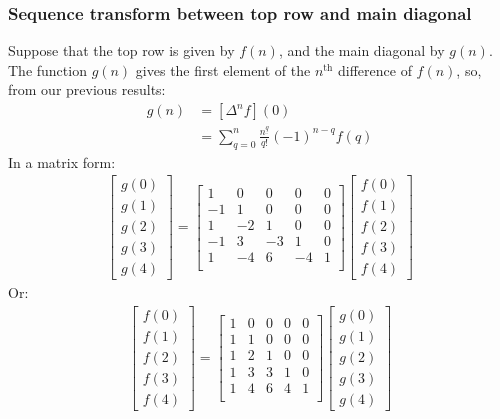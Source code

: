 \documentclass{article}
\renewcommand\({\left(}
\renewcommand\){\right)}
\begin{document}
\subsubsection{Sequence transform between top row and main diagonal}
Suppose that the top row is given by $f(n)$, and the main diagonal by $g(n)$. The function $g(n)$ gives the first element of the $n^\text{th}$ difference of $f(n)$, so, from our previous results:
\begin{align*}
    g(n)&=[\Delta^nf](0)\\
    &=\sum_{q=0}^n\frac{n^{\underline{q}}}{q!}(-1)^{n-q}f(q)
\end{align*}
In a matrix form:
\begin{align*}
    \begin{bmatrix}g(0)\\g(1)\\g(2)\\g(3)\\g(4)\end{bmatrix}=
    \begin{bmatrix}
 1 & 0 & 0 & 0 & 0 \\
 -1 & 1 & 0 & 0 & 0 \\
 1 & -2 & 1 & 0 & 0 \\
 -1 & 3 & -3 & 1 & 0 \\
 1 & -4 & 6 & -4 & 1 \\
    \end{bmatrix}
    \begin{bmatrix}f(0)\\f(1)\\f(2)\\f(3)\\f(4)\end{bmatrix}
\end{align*}
Or:
\begin{align*}
    \begin{bmatrix}f(0)\\f(1)\\f(2)\\f(3)\\f(4)\end{bmatrix}=
    \begin{bmatrix}
 1 & 0 & 0 & 0 & 0 \\
 1 & 1 & 0 & 0 & 0 \\
 1 & 2 & 1 & 0 & 0 \\
 1 & 3 & 3 & 1 & 0 \\
 1 & 4 & 6 & 4 & 1 \\
    \end{bmatrix}
    \begin{bmatrix}g(0)\\g(1)\\g(2)\\g(3)\\g(4)\end{bmatrix}
\end{align*}
\end{document}

